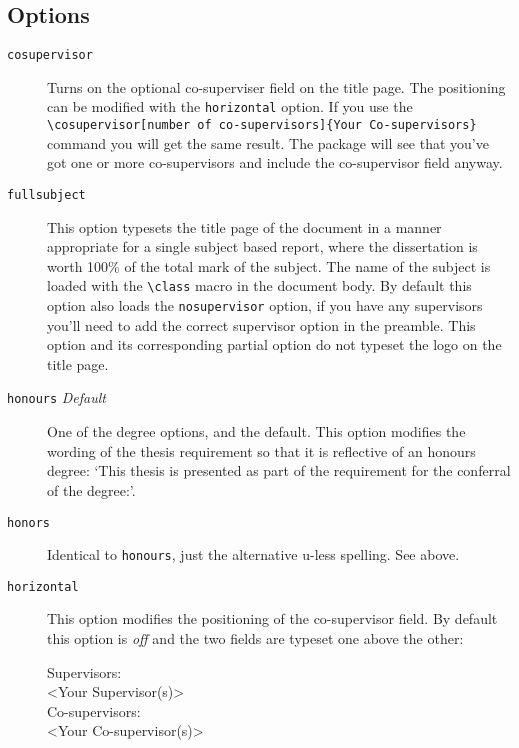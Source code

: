 \documentclass[12pt,oneside]{article}
\newcommand{\option}[1]{\texttt{\color{Green}#1}} %
\newcommand{\command}[1]{\texttt{\color{Red}#1}} %
\newcommand{\comoptions}[1]{\texttt{\color{Blue}#1}} %
\begin{document}
\subsection*{Options}
\begin{description}
    \item[\option{cosupervisor}] 
    Turns on the optional co-superviser field on the title page. The positioning can be modified with the \option{horizontal} option. If you use the \command{\textbackslash{}cosupervisor}\option{[number of co-supervisors]}\comoptions{\{Your Co-supervisors\}} command you will get the same result. The package will see that you've got one or more co-supervisors and include the co-supervisor field anyway.
    
    \item[\option{fullsubject}]
    This option typesets the title page of the document in a manner appropriate for a single subject based report, where the dissertation is worth 100\% of the total mark of the subject. The name of the subject is loaded with the \command{\textbackslash{}class} macro in the document body. By default this option also loads the \option{nosupervisor} option, if you have any supervisors you'll need to add the correct supervisor option in the preamble. This option and its corresponding partial option do not typeset the logo on the title page.
    
    \item[\option{honours} \emph{Default}]
    One of the degree options, and the default. This option modifies the wording of the thesis requirement so that it is reflective of an honours degree: `This thesis is presented as part of the requirement for the conferral of the degree:'.
    
    \item[\option{honors}]
    Identical to \option{honours}, just the alternative u-less spelling. See above.
    
    \item [\option{horizontal}]
    This option modifies the positioning of the co-supervisor field. By default this option is \emph{off} and the two fields are typeset one above the other:
    \begin{center}
        Supervisors:\\
        \textless{}Your Supervisor(s)\textgreater\\
        Co-supervisors:\\
        \textless{}Your Co-supervisor(s)\textgreater\\
    \end{center}
    

\end{description}
\end{document}
